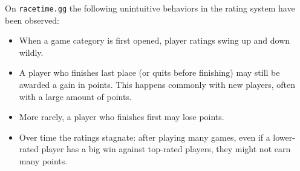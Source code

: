 \documentclass{article}
\begin{document}
	On \texttt{racetime.gg} the following unintuitive behaviors in the rating system have been observed:
	\begin{itemize}
		\item When a game category is first opened, player ratings swing up and down wildly.
		\item A player who finishes last place (or quits before finishing) may still be awarded a gain in points. This happens commonly with new players, often with a large amount of points.
		\item More rarely, a player who finishes first may lose points.
		\item Over time the ratings stagnate: after playing many games, even if a lower-rated player has a big win against top-rated players, they might not earn many points.
	\end{itemize}
	
\end{document}
